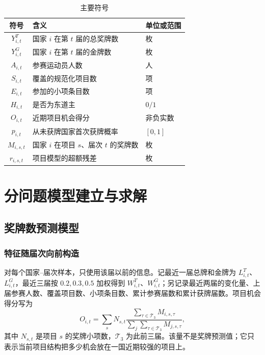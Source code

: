 \documentclass[UTF8,11pt,a4paper]{ctexart}
\begin{document}
\begin{table}[H]
\centering
\caption{主要符号}
\label{tab:symbols}
\begin{tabular}{cll}
\toprule
符号 & 含义 & 单位或范围\\
\midrule
$Y^{T}_{i,t}$ & 国家 $i$ 在第 $t$ 届的总奖牌数 & 枚\\
$Y^{G}_{i,t}$ & 国家 $i$ 在第 $t$ 届的金牌数 & 枚\\
$A_{i,t}$ & 参赛运动员人数 & 人\\
$S_{i,t}$ & 覆盖的规范化项目数 & 项\\
$E_{i,t}$ & 参加的小项条目数 & 项\\
$H_{i,t}$ & 是否为东道主 & $0/1$\\
$O_{i,t}$ & 近期项目机会得分 & 非负实数\\
$p_{i,t}$ & 从未获牌国家首次获牌概率 & $[0,1]$\\
$M_{i,s,t}$ & 国家 $i$ 在项目 $s$、届次 $t$ 的奖牌数 & 枚\\
$r_{i,s,t}$ & 项目模型的超额残差 & 枚\\
\bottomrule
\end{tabular}
\end{table}

\section{分问题模型建立与求解}

\subsection{奖牌数预测模型}

\subsubsection{特征随届次向前构造}

对每个国家--届次样本，只使用该届以前的信息。记最近一届总牌和金牌为 $L^T_{i,t}$、$L^G_{i,t}$，最近三届按 $0.2,0.3,0.5$ 加权得到 $W^T_{i,t}$、$W^G_{i,t}$；另记录最近两届的变化量、上届参赛人数、覆盖项目数、小项条目数、累计参赛届数和累计获牌届数。项目机会得分写为
\begin{equation}
O_{i,t}=\sum_s N_{s,t}\frac{\sum_{\tau\in\mathcal{T}_3}M_{i,s,\tau}}
{\sum_j\sum_{\tau\in\mathcal{T}_3}M_{j,s,\tau}},
\label{eq:opportunity}
\end{equation}
其中 $N_{s,t}$ 是项目 $s$ 的奖牌小项数，$\mathcal{T}_3$ 为此前三届。该量不是奖牌预测值；它只表示当前项目结构把多少机会放在一国近期较强的项目上。
\end{document}

